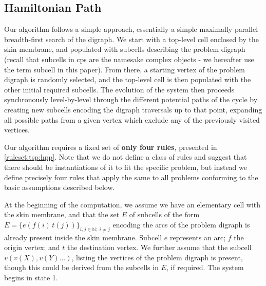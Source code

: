 
\subsection{Hamiltonian Path}
Our algorithm follows a simple approach, essentially a simple maximally parallel breadth-first search of the digraph.  We start with a top-level cell enclosed by the skin membrane, and populated with subcells describing the problem digraph (recall that subcells in \gls{cps} are the namesake complex objects - we hereafter use the term subcell in this paper).  From there, a starting vertex of the problem digraph is randomly selected, and the top-level cell is then populated with the other initial required subcells.  The evolution of the system then proceeds synchronously level-by-level through the different potential paths of the cycle by creating new subcells encoding the digraph traversals up to that point, expanding all possible paths from a given vertex which exclude any of the previously visited vertices.

Our algorithm requires a fixed set of \textbf{only four rules}, presented in \autoref{ruleset:tsp:hpp}.  Note that we do not define a class of rules and suggest that there should be instantiations of it to fit the specific problem, but instead we define precisely four rules that apply the same to all problems conforming to the basic assumptions described below.

At the beginning of the computation, we assume we have an elementary cell with the skin membrane, and that the set \(E\) of subcells of the form \(E = \{e(f(i)\,t(j))\}_{i,j \in \mathbb{N}; ~ i \neq j}\) encoding the arcs of the problem digraph is already present inside the skin membrane.  Subcell \(e\) represents an arc; \(f\) the origin vertex; and \(t\) the destination vertex.  We further assume that the subcell \( v(v(X),v(Y)...)\), listing the vertices of the problem digraph is present, though this could be derived from the subcells in \(E\), if required.  The system begins in state 1.


